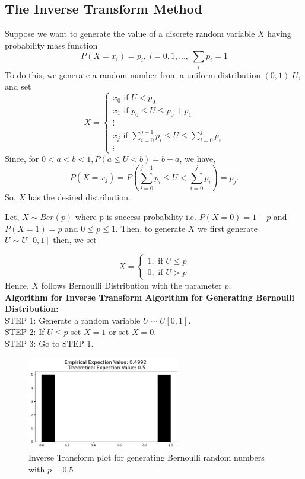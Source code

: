 \subsection{The Inverse Transform Method}
Suppose we want to generate the value of a discrete random variable $X$ having probability mass function
 \[
     P(X=x_i)=p_i, \ i = 0,1, \ldots , \ \sum_ip_i =1
\] 
To do this, we generate a random number from a uniform distribution $(0,1)$ $U$, and set
 \[
X=
\begin{cases}
    x_0 \text{ if } U<p_0 \\
    x_1 \text{ if } p_0\le U\le p_0+p_1 \\ 
    \vdots \\
    x_j \text{ if } \sum_{i=0}^{j-1}p_i\le U\le \sum_{i=0}^{j}p_i\\ 
    \vdots
\end{cases}
\] 
Since, for $0<a<b<1, P(a\le U<b) = b-a$, we have,
\[
    P(X=x_j)=P\left( \sum_{i=0}^{j-1}p_i\le U< \sum_{i=0}^{j}p_i \right) = p_j
.\] 
So, $X$ has the desired distribution.

\begin{example}
    Let, $X\sim Ber(p)$ where p is success probability  i.e.  $P(X=0)= 1-p$ and  $P(X=1)=p$ and $0\le p \le 1$.
    Then, to generate $X$ we first generate $U \sim U[0,1]$ then, we set

    \[
        X=
        \begin{cases}
            1, \text{ if } U\le p \\
            0, \text{ if } U> p
        \end{cases}
    \] 
    Hence, $X$ follows Bernoulli Distribution with the parameter $p$.\\ 
    \textbf{Algorithm for Inverse Transform Algorithm for Generating Bernoulli Distribution:}\\ 
    STEP 1: Generate a random variable $U\sim U[0,1]$.\\ 
    STEP 2: If $U\le p$ set $X=1$ or set  $X=0$. \\ 
    STEP 3: Go to  STEP 1.

    \begin{figure}[H]
        \centering
        \includegraphics[width=0.6\textwidth]{images/ber_ITA.png}
        \caption{Inverse Transform plot for generating  Bernoulli random numbers with $p=0.5$}
    \end{figure}
\end{example}

